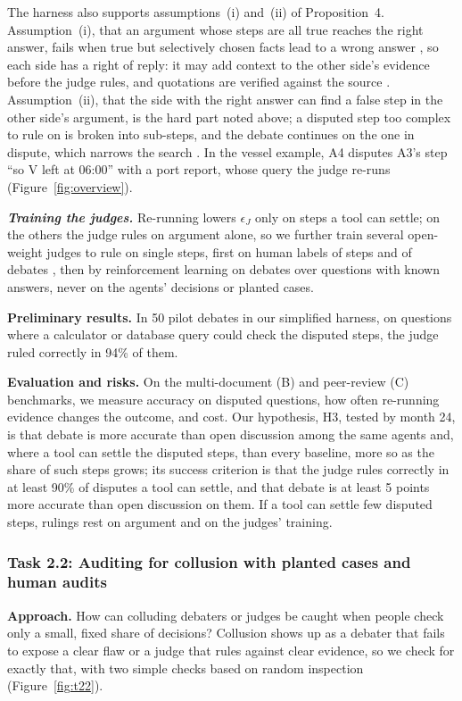 \documentclass[12pt,letterpaper]{article}
\newcommand{\hd}[1]{\ifhmode\par\fi\addvspace{1pt}\noindent\textbf{#1}\hspace{0.35em}}
\newcommand{\slab}[1]{\textbf{\textit{#1}}}
\begin{document}
The harness also supports assumptions~(i) and~(ii) of Proposition~4. Assumption~(i), that an argument whose steps are all true reaches the right answer, fails when true but selectively chosen facts lead to a wrong answer \citep{hu2026lying}, so each side has a right of reply: it may add context to the other side's evidence before the judge rules, and quotations are verified against the source \citep{khan2024debating}. Assumption~(ii), that the side with the right answer can find a false step in the other side's argument, is the hard part noted above; a disputed step too complex to rule on is broken into sub-steps, and the debate continues on the one in dispute, which narrows the search \citep{browncohen2025prover}. In the vessel example, A4 disputes A3's step ``so V left at 06:00'' with a port report, whose query the judge re-runs (Figure~\ref{fig:overview}).

\slab{Training the judges.} Re-running lowers $\epsilon_J$ only on steps a tool can settle; on the others the judge rules on argument alone, so we further train several open-weight judges to rule on single steps, first on human labels of steps and of debates \citep{lightman2024verify,michael2023debate,khan2024debating}, then by reinforcement learning on debates over questions with known answers, never on the agents' decisions or planted cases.

\hd{Preliminary results.} In 50 pilot debates in our simplified harness, on questions where a calculator or database query could check the disputed steps, the judge ruled correctly in 94\% of them.

\hd{Evaluation and risks.} On the multi-document (B) and peer-review (C) benchmarks, we measure accuracy on disputed questions, how often re-running evidence changes the outcome, and cost. Our hypothesis, H3, tested by month 24, is that debate is more accurate than open discussion among the same agents and, where a tool can settle the disputed steps, than every baseline, more so as the share of such steps grows; its success criterion is that the judge rules correctly in at least 90\% of disputes a tool can settle, and that debate is at least 5 points more accurate than open discussion on them. If a tool can settle few disputed steps, rulings rest on argument and on the judges' training.

\subsubsection{Task 2.2: Auditing for collusion with planted cases and human audits}\label{sec:t22}
\hd{Approach.} How can colluding debaters or judges be caught when people check only a small, fixed share of decisions? Collusion shows up as a debater that fails to expose a clear flaw or a judge that rules against clear evidence, so we check for exactly that, with two simple checks based on random inspection \citep{avenhaus2002inspection} (Figure~\ref{fig:t22}).
\end{document}
